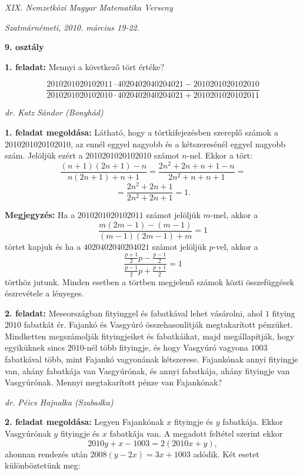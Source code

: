 \documentclass[a4paper,10pt]{article}
\def\ki#1#2{\hfill {\it #1 (#2)}\medskip}
\begin{document}
\begin{center} \Large {\em XIX. Nemzetközi Magyar Matematika Verseny} \end{center}
\begin{center} \large{\em Szatmárnémeti, 2010. március 19-22.} \end{center}
\smallskip
\begin{center} \large{\bf 9. osztály} \end{center}
\bigskip 

{\bf 1. feladat: } Mennyi a következő tört értéke?

$$\frac{2010201020102011\cdot4020402040204021-2010201020102010}{2010201020102010\cdot4020402040204021+2010201020102011}$$

\ki{dr. Katz Sándor}{Bonyhád}\medskip

{\bf 1. feladat megoldása: } Látható, hogy a törtkifejezésben szereplő számok a 2010201020102010,
az ennél eggyel nagyobb és a kétszeresénél eggyel nagyobb szám.
Jelöljük ezért a 2010201020102010 számot $n$-nel. Ekkor a tört:
$$\frac{(n+1)(2n+1)-n}{n(2n+1)+n+1}=\frac{2n^2+2n+n+1-n}{2n^2+n+n+1}=$$
$$=\frac{2n^2+2n+1}{2n^2+2n+1}=1.$$

\smallskip\textbf{Megjegyzés: } Ha a $2010201020102011$ számot jelöljük $m$-mel,
akkor a $$\frac{m(2m-1)-(m-1)}{(m-1)(2m-1)+m}=1$$ törtet kapjuk
és ha a $4020402040204021$ számot jelöljük $p$-vel, akkor a
$$\frac{\frac{p+1}{2}p-\frac{p-1}{2}}{\frac{p-1}{2}p+\frac{p+1}{2}}=1$$ törthöz jutunk.
Minden esetben a törtben megjelenő számok közti
összefüggések észrevétele a lényeges.

\medskip
{\bf 2. feladat: } Meseországban fityinggel és fabatkával lehet vásá\-rolni, ahol $1$
fitying $2010$ fabatkát ér. Fajankó és Vasgyúró összehasonlítják
megtakarított pénzüket. Mindketten megszámolják fityingjeiket és
fabatkáikat, majd megállapítják, hogy egyiküknek sincs $2010$-nél
több fityingje, és hogy Vasgyúró va\-gyo\-na $1003$ fabatkával több,
mint Fajankó vagyonának kétszerese. Fajankónak annyi fityingje van,
ahány fabatkája van Vasgyúrónak, és annyi fabatkája, ahány
fityingje van Vasgyúrónak. Mennyi megtakarított pénze van
Fajankónak?

\ki{dr. Péics Hajnalka}{Szabadka}\medskip

{\bf 2. feladat megoldása: }Legyen Fajankónak $x$ fityingje és $y$ fabatkája. Ekkor Vasgyúrónak
$y$ fityingje és $x$  fabatkája van. A megadott feltétel szerint
ekkor
\[2010y+x-1003=2(2010x+y),\]
ahonnan rendezés után $2008(y-2x)=3x+1003$ adódik. Két esetet
különböztetünk meg:
\end{document}
